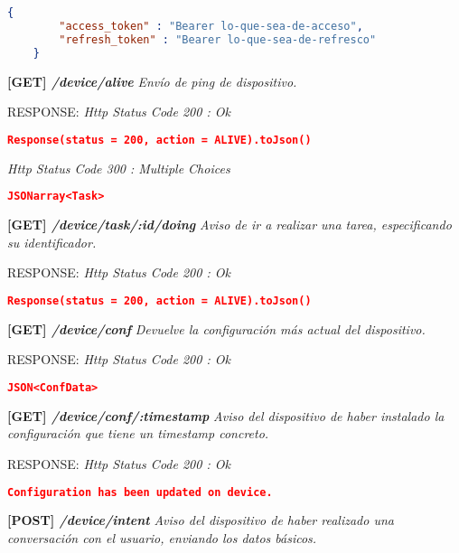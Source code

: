     \begin{lstlisting}[language=json,firstnumber=1]
    {
        "access_token" : "Bearer lo-que-sea-de-acceso",
        "refresh_token" : "Bearer lo-que-sea-de-refresco"
    }
    \end{lstlisting}    
\textbf{[GET] \textit{/device/alive }}
\textit{Envío de ping de dispositivo.}
    
    RESPONSE:\newline
    \textit{Http Status Code 200 : Ok}
    
    \begin{lstlisting}[language=json,firstnumber=1]
    Response(status = 200, action = ALIVE).toJson()
    \end{lstlisting}
    \textit{Http Status Code 300 : Multiple Choices}
    
    \begin{lstlisting}[language=json,firstnumber=1]
    JSONarray<Task>
    \end{lstlisting}
\hline 
\newline
\textbf{[GET] \textit{/device/task/:id/doing }}
\textit{Aviso de ir a realizar una tarea, especificando su identificador.}
    
    RESPONSE: \newline
    \textit{Http Status Code 200 : Ok}
    
    \begin{lstlisting}[language=json,firstnumber=1]
     Response(status = 200, action = ALIVE).toJson()
    \end{lstlisting}
\hline 
\newline
\textbf{[GET] \textit{/device/conf }}
\textit{Devuelve la configuración más actual del dispositivo.}
    
    RESPONSE: \newline
    \textit{Http Status Code 200 : Ok}
    
    \begin{lstlisting}[language=json,firstnumber=1]
    JSON<ConfData>
    \end{lstlisting}
\hline 
\newline
\textbf{[GET] \textit{/device/conf/:timestamp }}
\textit{Aviso del dispositivo de haber instalado la configuración que tiene un timestamp concreto.}

    RESPONSE: \newline
    \textit{Http Status Code 200 : Ok}
    
    \begin{lstlisting}[language=json,firstnumber=1]
    Configuration has been updated on device.
    \end{lstlisting}
\hline
\textbf{[POST] \textit{/device/intent }}
\textit{Aviso del dispositivo de haber realizado una conversación con el usuario, enviando los datos básicos.}

